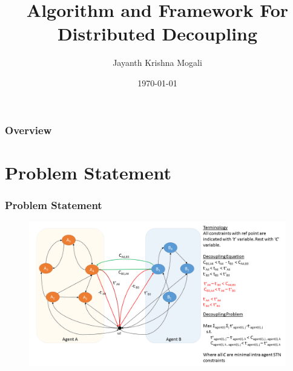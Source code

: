 \documentclass{beamer}
\title[Distributed Decoupling]{Algorithm and Framework For Distributed Decoupling} %
\author{Jayanth Krishna Mogali} %
\institute[ICLL Lab , CMU] %
{
Carnegie Mellon University\\ %
\medskip
\textit{jmogali@cs.cmu.edu} %
}
\date{\today} %
\begin{document}
\begin{frame}
\titlepage %
\end{frame}

\begin{frame}
\frametitle{Overview} %
\tableofcontents %
\end{frame}

\section{Problem Statement} %


\begin{frame}
\frametitle{Problem Statement}
\begin{figure}
\centering
    \includegraphics[width = 1.0	\textwidth]{Decoupling_figures.png}
\end{figure}
\end{frame}
\end{document}
